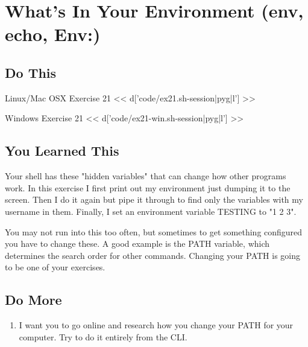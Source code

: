 \chapter{What's In Your Environment (env, echo, Env:)}

\section{Do This}

\begin{code}{Linux/Mac OSX Exercise 21}
<< d['code/ex21.sh-session|pyg|l'] >>
\end{code}

\begin{code}{Windows Exercise 21}
<< d['code/ex21-win.sh-session|pyg|l'] >>
\end{code}

\section{You Learned This}

Your shell has these "hidden variables" that can change how other programs work.
In this exercise I first print out my environment just dumping it to the screen.
Then I do it again but pipe it through  to find only the variables
with my username in them.  Finally, I set an environment variable TESTING to "1 2 3".

You may not run into this too often, but sometimes to get something configured
you have to change these.  A good example is the PATH variable, which determines
the search order for other commands.  Changing your PATH is going to be one
of your exercises.


\section{Do More}

\begin{enumerate}
\item I want you to go online and research how you change your PATH for your computer.  Try to do it entirely from the CLI.
\end{enumerate}

